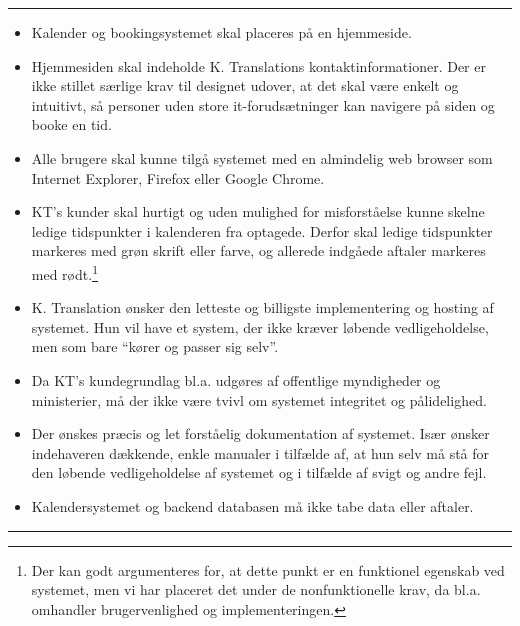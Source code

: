 \documentclass[12pt]{article}   %
\begin{document}
\rule{120mm}{1mm}
\begin{itemize}
\item Kalender og bookingsystemet skal placeres på en hjemmeside.
\item Hjemmesiden skal indeholde K. Translations kontaktinformationer. Der er
	ikke stillet særlige krav til designet udover, at det skal være enkelt
	og intuitivt, så personer uden store it-forudsætninger kan navigere på
	siden og booke en tid.
\item Alle brugere skal kunne tilgå systemet med en almindelig web browser som
	Internet Explorer, Firefox eller Google Chrome.
\item KT's kunder skal hurtigt og uden mulighed for misforståelse kunne skelne ledige
	tidspunkter i kalenderen fra optagede. Derfor skal ledige tidspunkter
	markeres med grøn skrift eller farve, og allerede indgåede aftaler
	markeres med rødt.\footnote{Der kan godt argumenteres for, at dette
		punkt er en funktionel egenskab ved systemet, men vi har
		placeret det under de nonfunktionelle krav, da bl.a. omhandler
	brugervenlighed og implementeringen.}
\item K. Translation ønsker den letteste og billigste implementering og
	hosting af systemet. Hun vil have et system, der ikke kræver løbende
	vedligeholdelse, men som bare ``kører og passer sig selv''.   
\item Da KT's kundegrundlag bl.a. udgøres af offentlige myndigheder og
	ministerier, må der ikke være tvivl om systemet integritet og
	pålidelighed.
\item Der ønskes præcis og let forståelig dokumentation af systemet. 
	Især ønsker indehaveren dækkende, enkle manualer i tilfælde af, at hun
	selv må stå for den løbende vedligeholdelse af systemet og i tilfælde
	af svigt og andre fejl.
\item Kalendersystemet og backend databasen må ikke tabe data eller aftaler.
\end{itemize}
\rule{120mm}{1mm}
\vspace{0.5cm}
\end{document}
